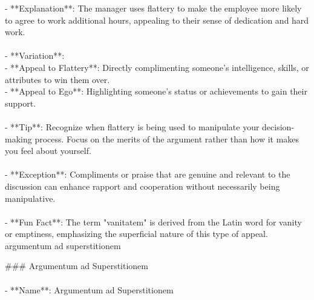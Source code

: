 \documentclass[a4paper,12pt,single,pdftex]{scrartcl}
\begin{document}
    
        - **Explanation**: The manager uses flattery to make the employee more likely to agree to work additional hours, appealing to their sense of dedication and hard work.
    \\

    
      
    \\

    
      - **Variation**:
    \\

    
        - **Appeal to Flattery**: Directly complimenting someone's intelligence, skills, or attributes to win them over.
    \\

    
        - **Appeal to Ego**: Highlighting someone's status or achievements to gain their support.
    \\

    
      
    \\

    
      - **Tip**: Recognize when flattery is being used to manipulate your decision-making process. Focus on the merits of the argument rather than how it makes you feel about yourself.
    \\

    
      
    \\

    
      - **Exception**: Compliments or praise that are genuine and relevant to the discussion can enhance rapport and cooperation without necessarily being manipulative.
    \\

    
      
    \\

    
      - **Fun Fact**: The term "vanitatem" is derived from the Latin word for vanity or emptiness, emphasizing the superficial nature of this type of appeal.
    \\

  

argumentum ad superstitionem
    
      \#\#\# Argumentum ad Superstitionem
    \\

    
      
    \\

    
      - **Name**: Argumentum ad Superstitionem
    \\
\end{document}
